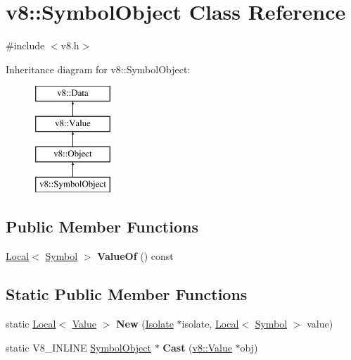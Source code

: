 \hypertarget{classv8_1_1SymbolObject}{}\section{v8\+:\+:Symbol\+Object Class Reference}
\label{classv8_1_1SymbolObject}


{\ttfamily \#include $<$v8.\+h$>$}

Inheritance diagram for v8\+:\+:Symbol\+Object\+:\begin{figure}[H]
\begin{center}
\leavevmode
\includegraphics[height=4.000000cm]{classv8_1_1SymbolObject}
\end{center}
\end{figure}
\subsection*{Public Member Functions}
\begin{DoxyCompactItemize}
\item 
\hyperlink{classv8_1_1Local}{Local}$<$ \hyperlink{classv8_1_1Symbol}{Symbol} $>$ {\bfseries Value\+Of} () const \hypertarget{classv8_1_1SymbolObject_a4a3b439c6784a4a8d9bdc5a246e12b85}{}\label{classv8_1_1SymbolObject_a4a3b439c6784a4a8d9bdc5a246e12b85}

\end{DoxyCompactItemize}
\subsection*{Static Public Member Functions}
\begin{DoxyCompactItemize}
\item 
static \hyperlink{classv8_1_1Local}{Local}$<$ \hyperlink{classv8_1_1Value}{Value} $>$ {\bfseries New} (\hyperlink{classv8_1_1Isolate}{Isolate} $\ast$isolate, \hyperlink{classv8_1_1Local}{Local}$<$ \hyperlink{classv8_1_1Symbol}{Symbol} $>$ value)\hypertarget{classv8_1_1SymbolObject_a3a3dc109d1207e4fe20671c17f5426c0}{}\label{classv8_1_1SymbolObject_a3a3dc109d1207e4fe20671c17f5426c0}

\item 
static V8\+\_\+\+I\+N\+L\+I\+NE \hyperlink{classv8_1_1SymbolObject}{Symbol\+Object} $\ast$ {\bfseries Cast} (\hyperlink{classv8_1_1Value}{v8\+::\+Value} $\ast$obj)\hypertarget{classv8_1_1SymbolObject_aa98d7c4211bd55e347ee8169143fcec9}{}\label{classv8_1_1SymbolObject_aa98d7c4211bd55e347ee8169143fcec9}

\end{DoxyCompactItemize}


